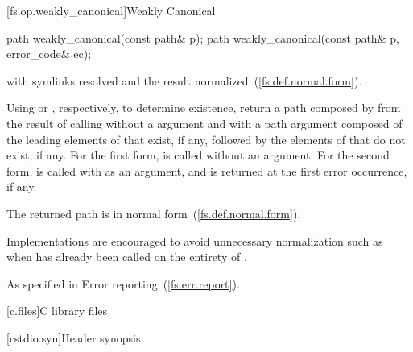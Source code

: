 [fs.op.weakly_canonical]{Weakly Canonical}

%
\begin{itemdecl}
path weakly_canonical(const path& p);
path weakly_canonical(const path& p, error_code& ec);
\end{itemdecl}

\begin{itemdescr}
\pnum
\returns {} with symlinks resolved and
  the result normalized~(\ref{fs.def.normal.form}).

\pnum
\effects Using  or , respectively,
  to determine existence,
  return a path composed by 
  from the result of calling 
  without a  argument and
  with a path argument composed of
  the leading elements of  that exist, if any, followed by
  the elements of  that do not exist, if any.
  For the first form,
   is called without an  argument.
  For the second form,
   is called
  with  as an  argument, and
   is returned at the first error occurrence, if any.

\pnum
\postconditions The returned path is in normal form~(\ref{fs.def.normal.form}).

\pnum
\remarks Implementations are encouraged
  to avoid unnecessary normalization such as
  when  has already been called on the entirety of .

\pnum
\throws As specified in Error reporting~(\ref{fs.err.report}).
\end{itemdescr}

[c.files]{C library files}

[cstdio.syn]{Header  synopsis}


